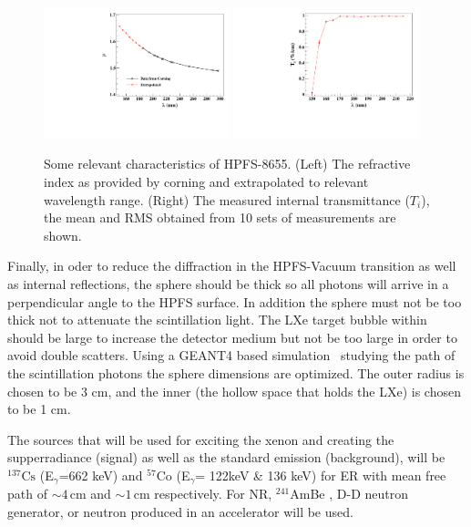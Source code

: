 \begin{figure}[h]
   \centering
   \includegraphics[width=0.48\textwidth]{RI-calibration.pdf}
    \includegraphics[width=0.48\textwidth]{IntTransmittance.pdf}
   \caption{Some relevant characteristics of HPFS-8655. (Left) The refractive index as provided by corning and 
   extrapolated to relevant wavelength range. (Right) The measured internal transmittance ($T_{i}$), the mean and RMS obtained from 10 sets of 
measurements are shown.}  
   \label{fig:hpfsRIcalibration}
\end{figure}


Finally, in oder to reduce the diffraction in the HPFS-Vacuum transition as well as internal reflections, the sphere should be thick so all photons will arrive in a perpendicular angle to the HPFS surface. In addition the sphere must not be too thick not to attenuate the scintillation light. The LXe target bubble within should be large to increase the detector medium but not be too large in order to avoid double scatters. Using a GEANT4 based simulation~\cite{AGOSTINELLI2003250} studying the path of the scintillation photons the sphere dimensions are optimized. The outer radius is chosen to be 3 cm, and the inner (the hollow space that holds the LXe) is chosen to be 1 cm. 


The sources that will be used for exciting the xenon and creating the supperradiance (signal) as well as the standard emission (background), will be $^{137} \mathrm{Cs}$ 
(E$_\gamma$=662 keV) and $^{57} \mathrm{Co}$ (E$_\gamma$= 122keV \& 136 keV) for ER with mean free path of $\sim4$\,cm and $\sim1$\,cm respectively. For NR, $^{241}$AmBe , D-D neutron generator, or neutron produced in an accelerator will be used. 



